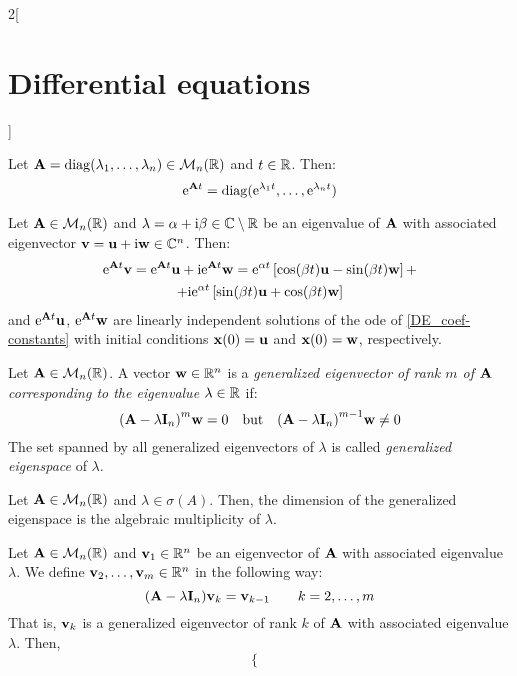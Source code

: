 \documentclass[../../../main.tex]{subfiles}
\begin{document}
\begin{multicols}{2}[\section{Differential equations}]
\begin{corollary}
    \end{corollary}
    \begin{lemma}
        Let $\vf{A}=\diag(\lambda_1,\ldots,\lambda_n)\in\mathcal{M}_n(\RR)$ and $t\in\RR$. Then:
        $$\exp{\vf{A}t}=\diag(\exp{\lambda_1 t},\ldots,\exp{\lambda_n t})$$
    \end{lemma}
    \begin{prop}
        Let $\vf{A}\in\mathcal{M}_n(\RR)$ and $\lambda=\alpha+\ii\beta\in\CC\setminus\RR$ be an eigenvalue of $\vf{A}$ with associated eigenvector $\vf{v}=\vf{u}+\ii\vf{w}\in\CC^n$. Then:
        \begin{multline*}
            \mathrm{e}^{\boldsymbol{\mathrm{A}}t}\boldsymbol{\mathrm{v}}=\mathrm{e}^{\boldsymbol{\mathrm{A}}t}\boldsymbol{\mathrm{u}}+\mathrm{i}\mathrm{e}^{\boldsymbol{\mathrm{A}}t}\boldsymbol{\mathrm{w}}=\mathrm{e}^{\alpha t}\left[\cos(\beta t)\boldsymbol{\mathrm{u}}-\sin(\beta t)\boldsymbol{\mathrm{w}}\right]+\\+\mathrm{i}\mathrm{e}^{\alpha t}\left[\sin(\beta t)\boldsymbol{\mathrm{u}}+\cos(\beta t)\boldsymbol{\mathrm{w}}\right]
        \end{multline*}
        and $\exp{\vf{A}t}\vf{u}$, $\exp{\vf{A}t}\vf{w}$ are linearly independent solutions of the ode of \cref{DE_coef-constants} with initial conditions $\vf{x}(0)=\vf{u}$ and $\vf{x}(0)=\vf{w}$, respectively.
    \end{prop}
    \begin{definition}
        Let $\vf{A}\in\mathcal{M}_n(\RR)$. A vector $\vf{w}\in\RR^n$ is a \textit{generalized eigenvector of rank $m$ of $\vf{A}$ corresponding to the eigenvalue $\lambda\in\RR$} if: $${(\vf{A}-\lambda\vf{I}_n)}^m\vf{w}=0\quad\text{but}\quad{(\vf{A}-\lambda\vf{I}_n)}^{m-1}\vf{w}\ne 0$$
        The set spanned by all generalized eigenvectors of $\lambda$ is called \textit{generalized eigenspace} of $\lambda$.
    \end{definition}
    \begin{prop}
        Let $\vf{A}\in\mathcal{M}_n(\RR)$ and $\lambda\in\sigma(A)$. Then, the dimension of the generalized eigenspace is the algebraic multiplicity of $\lambda$.
    \end{prop}
    \begin{lemma}
        Let $\vf{A}\in\mathcal{M}_n(\RR)$ and $\vf{v}_1\in\RR^n$ be an eigenvector of $\vf{A}$ with associated eigenvalue $\lambda$. We define $\vf{v}_2,\ldots,\vf{v}_m\in\RR^n$ in the following way: $$(\vf{A}-\lambda\vf{I}_n)\vf{v}_k=\vf{v}_{k-1}\qquad k=2,\ldots, m$$
        That is, $\vf{v}_k$ is a generalized eigenvector of rank $k$ of $\vf{A}$ with associated eigenvalue $\lambda$. Then,
        $$
            \left\{
            \begin{aligned}

\end{aligned}$$
\end{lemma}
\end{multicols}
\end{document}
